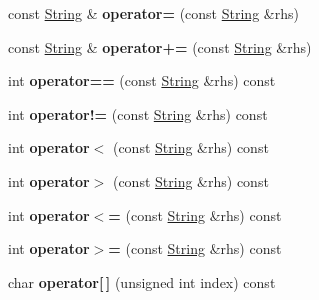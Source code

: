 \begin{DoxyCompactItemize}
\item 
\hypertarget{classString_a948f0764e4c1bc9b0229b588475c12b8}{
const \hyperlink{classString}{\-String} \& {\bfseries operator=} (const \hyperlink{classString}{\-String} \&rhs)}
\label{classString_a948f0764e4c1bc9b0229b588475c12b8}

\item 
\hypertarget{classString_a942664cd417e945729bd7e84b7ee5551}{
const \hyperlink{classString}{\-String} \& {\bfseries operator+=} (const \hyperlink{classString}{\-String} \&rhs)}
\label{classString_a942664cd417e945729bd7e84b7ee5551}

\item 
\hypertarget{classString_a1f2e5754b50d71ff8214b4e3a2eb5af2}{
int {\bfseries operator==} (const \hyperlink{classString}{\-String} \&rhs) const }
\label{classString_a1f2e5754b50d71ff8214b4e3a2eb5af2}

\item 
\hypertarget{classString_a36db6357dafed08267484852ddaafc69}{
int {\bfseries operator!=} (const \hyperlink{classString}{\-String} \&rhs) const }
\label{classString_a36db6357dafed08267484852ddaafc69}

\item 
\hypertarget{classString_a47b8b84dc27e295c05b8b1f93a6605b2}{
int {\bfseries operator$<$} (const \hyperlink{classString}{\-String} \&rhs) const }
\label{classString_a47b8b84dc27e295c05b8b1f93a6605b2}

\item 
\hypertarget{classString_a239f2d617dcfa752a1cc83b2615cc7b7}{
int {\bfseries operator$>$} (const \hyperlink{classString}{\-String} \&rhs) const }
\label{classString_a239f2d617dcfa752a1cc83b2615cc7b7}

\item 
\hypertarget{classString_a0cac0e8a22a9e97d6a11e0b17f83e802}{
int {\bfseries operator$<$=} (const \hyperlink{classString}{\-String} \&rhs) const }
\label{classString_a0cac0e8a22a9e97d6a11e0b17f83e802}

\item 
\hypertarget{classString_aeca39c0d1c675a9ccf831814fecdeba7}{
int {\bfseries operator$>$=} (const \hyperlink{classString}{\-String} \&rhs) const }
\label{classString_aeca39c0d1c675a9ccf831814fecdeba7}

\item 
\hypertarget{classString_a1fcf18cc37ee5df15e78e1b0eba1e9da}{
char {\bfseries operator\mbox{[}$\,$\mbox{]}} (unsigned int index) const }
\label{classString_a1fcf18cc37ee5df15e78e1b0eba1e9da}


\end{DoxyCompactItemize}
